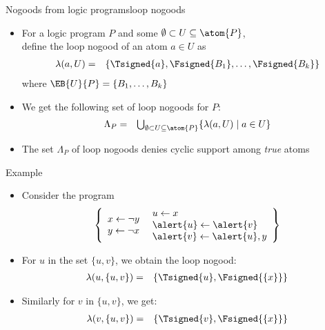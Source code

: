 \begin{frame}{Nogoods from logic programs}{loop nogoods} %
  \begin{itemize}
  \item<1->
    For a logic program $P$ and some $\emptyset \subset U\subseteq\atom{P}$,\\
    define the \alert{loop nogood} of an atom $a\in U$ as
    \begin{eqnarray*}
      \lambda(a,U)
      & = &
      \{\Tsigned{a},\Fsigned{B_1},\dots,\Fsigned{B_k}\}
    \end{eqnarray*}
    where $\EB{U}{P}=\{B_1,\dots,B_k\}$
    \medskip
  \item<2->
    We get the following set of loop nogoods for $P$:
    \begin{eqnarray*}
      \Lambda_P
      & = &
      \textstyle
      \bigcup_{\emptyset\subset U\subseteq \atom{P}}
      \{
      \lambda(a,U)
      \mid
      a\in U
      \}
    \end{eqnarray*}
  \item<3->  The set $\Lambda_P$ of loop nogoods denies cyclic
    support among \emph{true} atoms
  \end{itemize}
\end{frame}
\begin{frame}{Example}
  \begin{itemize}
  \item<1-> Consider the program
    \[
    \left\{
      \begin{array}{l}
        x  \leftarrow  \neg y\\
        y  \leftarrow  \neg x
      \end{array}
      \
      \begin{array}{l}
        u  \leftarrow  x\\
        \alert{u}  \leftarrow  \alert{v}\\
        \alert{v}  \leftarrow  \alert{u}, y
      \end{array}
    \right\}
    \]
  \item<2-> For $u$ in the set $\{u,v\}$, we obtain the loop nogood:
    \begin{eqnarray*}
      \lambda(u,\{u,v\}) &=& \{\Tsigned{u},\Fsigned{\{x\}}\}
    \end{eqnarray*}
  \item<3-> [] Similarly for $v$ in $\{u,v\}$, we get:
    \begin{eqnarray*}
      \lambda(v,\{u,v\}) &=& \{\Tsigned{v},\Fsigned{\{x\}}\}
    \end{eqnarray*}
  \end{itemize}
\end{frame}
